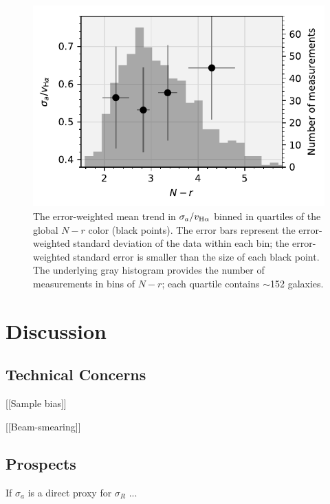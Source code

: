\documentclass[apj,iop,revtex4,numberedappendix]{emulateapj}
\begin{document}
\begin{figure}
%
\begin{center}
%
\includegraphics[width=1.0\columnwidth]{figs/adov_vs_color.pdf}
%
\end{center}
%
\caption{
%
The error-weighted mean trend in $\sigma_a/v_{{\rm H}\alpha}$ binned in
quartiles of the global $N-r$ color (black points).  The error bars
represent the error-weighted standard deviation of the data within each
bin; the error-weighted standard error is smaller than the size of each
black point.  The underlying gray histogram provides the number of
measurements in bins of $N-r$; each quartile contains $\sim$152
galaxies.
%
}
%
\label{fig:colortrend}
%
\end{figure}

\section{Discussion}
\label{sec:discussion}

\subsection{Technical Concerns}

[[Sample bias]]

[[Beam-smearing]]

\subsection{Prospects}

If $\sigma_a$ is a direct proxy for $\sigma_R$ ...


\end{document}
